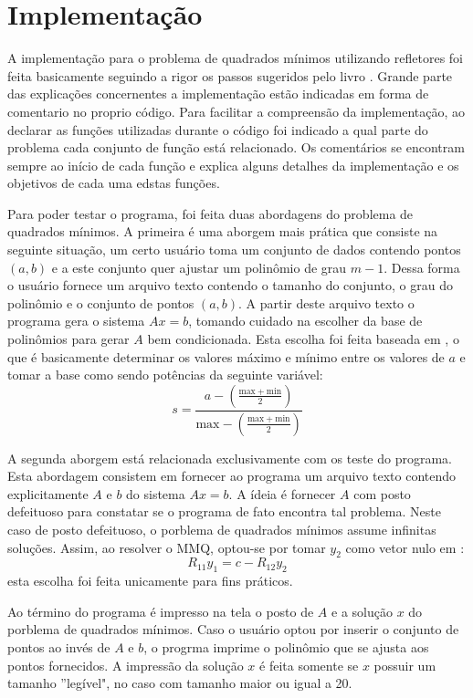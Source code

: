 \documentclass [a4paper,10pt]{article}
\begin{document}
{    \section{Implementação}
    A implementação para o problema de quadrados mínimos utilizando refletores foi feita basicamente seguindo
    a rigor os passos sugeridos pelo livro \cite{livro1}. Grande parte das explicações concernentes a implementação estão
    indicadas em forma de comentario no proprio código. Para facilitar a compreensão da implementação, ao declarar as funções
    utilizadas durante o código foi indicado a qual parte do problema cada conjunto de função está relacionado. Os comentários
    se encontram sempre ao início de cada função e explica alguns detalhes da implementação e os objetivos de cada uma edstas
    funções.

    Para poder testar o programa, foi feita duas abordagens do problema de quadrados mínimos. A primeira é uma aborgem mais
    prática que consiste na seguinte situação, um certo usuário toma um conjunto de dados contendo pontos $(a, b)$ e a este conjunto
    quer ajustar um polinômio de grau $m - 1$. Dessa forma o usuário fornece um arquivo texto contendo o tamanho do conjunto,
    o grau do polinômio e o conjunto de pontos $(a, b)$. A partir deste arquivo texto o programa gera o sistema $Ax = b$, tomando
    cuidado na escolher da base de polinômios para gerar $A$ bem condicionada.
    Esta escolha foi feita baseada em \cite{livro2}, o que é basicamente
    determinar os valores máximo e mínimo entre os valores de $a$ e tomar a base como sendo potências da seguinte variável:
    \begin{equation}\label{base}
        s = \frac{a - \left(\frac{\mathrm{max} + \mathrm{min}}{2}\right)}{\mathrm{max} - \left(\frac{\mathrm{max} + \mathrm{min}}{2}\right)}
    \end{equation}


    A segunda aborgem está relacionada exclusivamente com os teste do programa. Esta abordagem consistem em fornecer ao programa
    um arquivo texto contendo explicitamente $A$ e $b$ do sistema $Ax = b$. A ídeia é fornecer $A$ com posto defeituoso para constatar
    se o programa de fato encontra tal problema. Neste caso de posto defeituoso, o porblema de quadrados mínimos assume infinitas
    soluções. Assim, ao resolver o MMQ, optou-se por tomar $y_2$ como vetor nulo em \cite{livro1}:
    \[
        R_{11}y_1 = c - R_{12}y_2
    \]
    esta escolha foi feita unicamente para fins práticos.

    Ao término do programa é impresso na tela o posto de $A$ e a solução $x$ do porblema de quadrados mínimos. Caso o usuário
    optou por inserir o conjunto de pontos ao invés de $A$ e $b$, o progrma imprime o polinômio que se ajusta aos pontos fornecidos.
    A impressão da solução $x$ é feita somente se $x$ possuir um tamanho ''legível", no caso com tamanho maior ou igual a 20.

}
\end{document}
